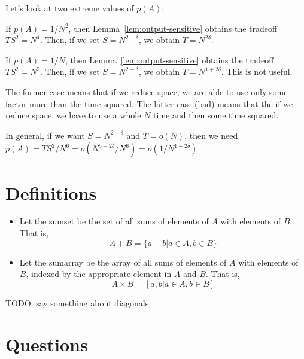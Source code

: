 \documentclass{article}
\begin{document}
Let's look at two extreme values of $p(A)$:

If $p(A) = 1/N^2$, then Lemma~\ref{lem:output-sensitive} obtains the tradeoff $TS^2 = N^4$.  Then, if we set $S = N^{2-\delta}$, we obtain $T = N^{2\delta}$.

If $p(A) = 1/N$, then Lemma~\ref{lem:output-sensitive} obtains the tradeoff $TS^2 = N^5$.  Then, if we set $S = N^{2-\delta}$, we obtain $T = N^{1+2\delta}$.  This is not useful.

The former case means that if we reduce space, we are able to use only some factor more than the time squared. The latter case (bad) means that the if we reduce space, we have to use a whole $N$ time and then some time squared.

In general, if we want $S = N^{2-\delta}$ and $T = o(N)$, then we need $p(A) = TS^2/N^6 = o(N^{5-2\delta}/N^6) = o(1/N^{1+2\delta})$.

\section{Definitions}%
\label{sec:definitions}
\begin{itemize}
    \item Let the sumset be the set of all sums of elements of $A$ with elements of $B$. That is,
    $$A+B = \{a+b | a \in A, b \in B\}$$
    \item Let the sumarray be the array of all sums of elements of $A$ with elements of $B$, indexed by the appropriate element in $A$ and $B$. That is,
    $$A \times B = [a,b | a\in A, b \in B]$$
\end{itemize}

TODO: say something about diagonals



\section{Questions}%
\label{sec:questions}
\end{document}
